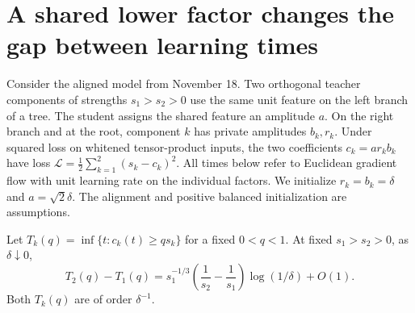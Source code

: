 \section{A shared lower factor changes the gap between learning times}
\label{sec:shared-gap}

Consider the aligned model from November 18. Two orthogonal teacher components
of strengths \(s_1>s_2>0\) use the same unit feature on the left branch of a
tree. The student assigns the shared feature an amplitude \(a\). On the right
branch and at the root, component \(k\) has private amplitudes \(b_k,r_k\).
Under squared loss on whitened tensor-product inputs, the two coefficients
\(c_k=a r_k b_k\) have loss
\(\mathcal L=\tfrac12\sum_{k=1}^2(s_k-c_k)^2\). All times below refer to
Euclidean gradient flow with unit learning rate on the individual factors.
We initialize \(r_k=b_k=\delta\) and \(a=\sqrt{2}\delta\).
The alignment and positive balanced initialization are assumptions.

\begin{theorem}
\label{thm:shared-gap}
Let \(T_k(q)=\inf\{t:c_k(t)\ge q s_k\}\) for a fixed \(0<q<1\). At fixed
\(s_1>s_2>0\), as \(\delta\downarrow0\),
\begin{equation}
 T_2(q)-T_1(q)=
 s_1^{-1/3}\left(\frac{1}{s_2}-\frac{1}{s_1}\right)
 \log(1/\delta)+O(1).
 \label{eq:shared-gap}
\end{equation}
Both \(T_k(q)\) are of order \(\delta^{-1}\).
\end{theorem}

